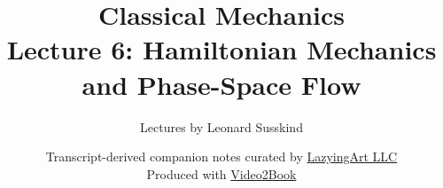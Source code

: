 \documentclass[11pt,oneside]{book}
\begin{document}
\hypersetup{pageanchor=false}
\frontmatter
\title{Classical Mechanics\\[0.45em]
\large Lecture 6: Hamiltonian Mechanics and Phase-Space Flow}
\author{Lectures by Leonard Susskind}
\date{Transcript-derived companion notes curated by
\href{https://lazying.art}{LazyingArt LLC}\\[0.35em]
\small Produced with
\href{https://github.com/lachlanchen/Video2Book}{Video2Book}}
\maketitle
\hypersetup{pageanchor=true}
\mainmatter

\end{document}
